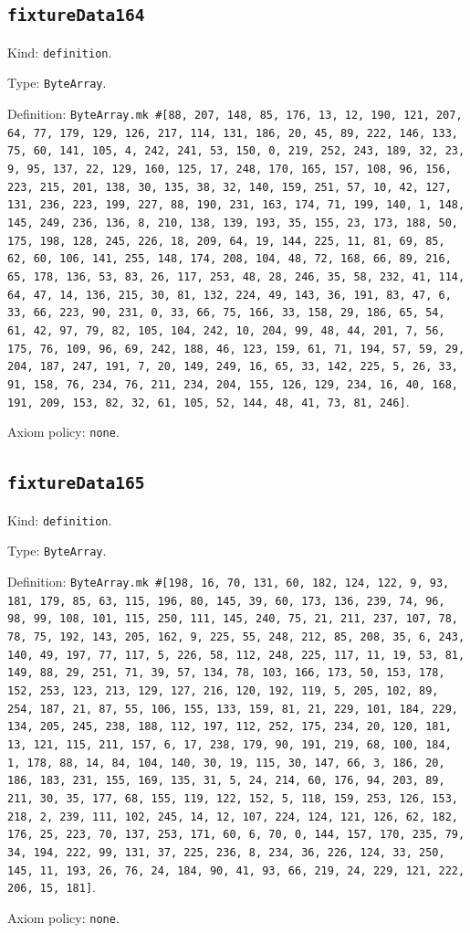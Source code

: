\documentclass[11pt]{article}
\begin{document}
\subsection*{\texttt{fixtureData164}}
\noindent Kind: \texttt{definition}.\par
\noindent Type: \texttt{ByteArray}.\par
\noindent Definition: \texttt{ByteArray.mk \#[88, 207, 148, 85, 176, 13, 12, 190, 121, 207, 64, 77, 179, 129, 126, 217, 114, 131, 186, 20, 45, 89, 222, 146, 133, 75, 60, 141, 105, 4, 242, 241, 53, 150, 0, 219, 252, 243, 189, 32, 23, 9, 95, 137, 22, 129, 160, 125, 17, 248, 170, 165, 157, 108, 96, 156, 223, 215, 201, 138, 30, 135, 38, 32, 140, 159, 251, 57, 10, 42, 127, 131, 236, 223, 199, 227, 88, 190, 231, 163, 174, 71, 199, 140, 1, 148, 145, 249, 236, 136, 8, 210, 138, 139, 193, 35, 155, 23, 173, 188, 50, 175, 198, 128, 245, 226, 18, 209, 64, 19, 144, 225, 11, 81, 69, 85, 62, 60, 106, 141, 255, 148, 174, 208, 104, 48, 72, 168, 66, 89, 216, 65, 178, 136, 53, 83, 26, 117, 253, 48, 28, 246, 35, 58, 232, 41, 114, 64, 47, 14, 136, 215, 30, 81, 132, 224, 49, 143, 36, 191, 83, 47, 6, 33, 66, 223, 90, 231, 0, 33, 66, 75, 166, 33, 158, 29, 186, 65, 54, 61, 42, 97, 79, 82, 105, 104, 242, 10, 204, 99, 48, 44, 201, 7, 56, 175, 76, 109, 96, 69, 242, 188, 46, 123, 159, 61, 71, 194, 57, 59, 29, 204, 187, 247, 191, 7, 20, 149, 249, 16, 65, 33, 142, 225, 5, 26, 33, 91, 158, 76, 234, 76, 211, 234, 204, 155, 126, 129, 234, 16, 40, 168, 191, 209, 153, 82, 32, 61, 105, 52, 144, 48, 41, 73, 81, 246]}.\par
\noindent Axiom policy: \texttt{none}.\par
\subsection*{\texttt{fixtureData165}}
\noindent Kind: \texttt{definition}.\par
\noindent Type: \texttt{ByteArray}.\par
\noindent Definition: \texttt{ByteArray.mk \#[198, 16, 70, 131, 60, 182, 124, 122, 9, 93, 181, 179, 85, 63, 115, 196, 80, 145, 39, 60, 173, 136, 239, 74, 96, 98, 99, 108, 101, 115, 250, 111, 145, 240, 75, 21, 211, 237, 107, 78, 78, 75, 192, 143, 205, 162, 9, 225, 55, 248, 212, 85, 208, 35, 6, 243, 140, 49, 197, 77, 117, 5, 226, 58, 112, 248, 225, 117, 11, 19, 53, 81, 149, 88, 29, 251, 71, 39, 57, 134, 78, 103, 166, 173, 50, 153, 178, 152, 253, 123, 213, 129, 127, 216, 120, 192, 119, 5, 205, 102, 89, 254, 187, 21, 87, 55, 106, 155, 133, 159, 81, 21, 229, 101, 184, 229, 134, 205, 245, 238, 188, 112, 197, 112, 252, 175, 234, 20, 120, 181, 13, 121, 115, 211, 157, 6, 17, 238, 179, 90, 191, 219, 68, 100, 184, 1, 178, 88, 14, 84, 104, 140, 30, 19, 115, 30, 147, 66, 3, 186, 20, 186, 183, 231, 155, 169, 135, 31, 5, 24, 214, 60, 176, 94, 203, 89, 211, 30, 35, 177, 68, 155, 119, 122, 152, 5, 118, 159, 253, 126, 153, 218, 2, 239, 111, 102, 245, 14, 12, 107, 224, 124, 121, 126, 62, 182, 176, 25, 223, 70, 137, 253, 171, 60, 6, 70, 0, 144, 157, 170, 235, 79, 34, 194, 222, 99, 131, 37, 225, 236, 8, 234, 36, 226, 124, 33, 250, 145, 11, 193, 26, 76, 24, 184, 90, 41, 93, 66, 219, 24, 229, 121, 222, 206, 15, 181]}.\par
\noindent Axiom policy: \texttt{none}.\par
\end{document}
